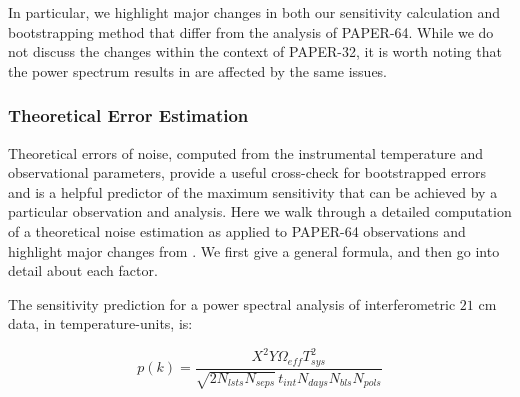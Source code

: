 \documentclass[preprint2,numberedappendix,tighten]{aastex6}  %
\begin{document}
In particular, we highlight major changes in both our sensitivity calculation and bootstrapping method that differ from the \citet{ali_et_al2015} analysis of PAPER-64. While we do not discuss the changes within the context of PAPER-32, it is worth noting that the power spectrum results in \citet{parsons_et_al2014} are affected by the same issues.

\subsubsection{Theoretical Error Estimation}
\label{sec:PSSense}

Theoretical errors of noise, computed from the instrumental temperature and observational parameters, provide a useful cross-check for bootstrapped errors and is a helpful predictor of the maximum sensitivity that can be achieved by a particular observation and analysis. Here we walk through a detailed computation of a theoretical noise estimation as applied to PAPER-64 observations and highlight major changes from \citet{ali_et_al2015}. We first give a general formula, and then go into detail about each factor.

The sensitivity prediction for a power spectral analysis of interferometric $21$ cm data, in temperature-units, is:

\begin{equation}
\label{eq:sense}
p(k) = \frac{X^{2}Y \Omega_{eff} T_{sys}^{2}}{\sqrt{2N_{lsts}N_{seps}}\,t_{int}N_{days}N_{bls}N_{pols}}
\end{equation}
\end{document}
